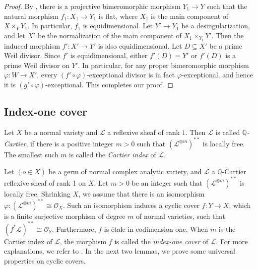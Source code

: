 \documentclass[12pt]{amsart}
\newcommand{\mbQ}{\mathbb{Q}}
\newcommand{\<}{\leq}
\def\subset{\subseteq}
\def\mcO{\mathcal{O}}
\def\mcL{\mathcal{L}}
\def\msL{\mathscr{L}}
\theoremstyle{remark}
\theoremstyle{definition}
\newtheorem{definition}[theorem]{Definition}
\theoremstyle{definition}
\numberwithin{equation}{section}
\theoremstyle{definition}
\theoremstyle{definition}
\begin{document}
\begin{proof}
 By   \cite[Corollary 1]{Hir75}, there is a  projective bimeromorphic morphism $Y_1\to Y$ such that the natural morphism $f_1\colon X_1 \to Y_1$ is flat, where $X_1$ is the main component of $X\times_Y Y_1$. 
In particular, $f_1$ is equidimensional. 
Let $Y' \to Y_1$ be a desingularization, and let $X'$ be the normalization of the main component of $X_1\times_{Y_1} Y'$. 
Then the induced morphism $f'\colon X'\to Y'$ is also equidimensional. Let $D\subset X'$ be a prime Weil divisor. Since $f'$ is equidimensional, either $f'(D)=Y'$ or $f'(D)$ is a prime Weil divisor on $Y'$. In particular, for any proper bimeromorphic morphism $\varphi\colon W\to X'$, every $(f'\circ\varphi)$-exceptional divisor is in fact $\varphi$-exceptional, and hence it is  $(g'\circ\varphi)$-exceptional. This completes our proof.
\end{proof}




\subsection{Index-one cover} 

Let $X$ be a normal variety and $\msL$ a reflexive sheaf of rank $1$. Then $\msL$ is called \textit{$\mbQ$-Cartier}, if there is a positive integer $m>0$ such that $(\msL^{\otimes m})^{**}$ is locally free. 
The smallest such $m$ is   called the \textit{Cartier index} of $\msL$. 
 

 


Let $(o\in X)$ be a germ of normal complex analytic variety, and $\mcL$ a $\mbQ$-Cartier reflexive sheaf of rank 1 on $X$.  
Let $m>0$ be an integer such that $(\mcL^{\otimes m})^{**}$ is locally free. 
Shrinking $X$,    we  assume that there is an isomorphism $\varphi\colon (\mcL^{\otimes m})^{**} \cong \mcO_X$. 
Such an isomorphism induces a cyclic cover $f\colon Y \to X$,  
which is a  finite surjective morphism  of degree $m$ of normal varieties, 
such that $(f^*\mcL)^{**}\cong \mcO_Y$. 
Furthermore, $f$ is \'etale in codimension one.  
When $m$ is the Cartier index of $\mcL$, the  morphism $f$ is called the \emph{index-one cover} of $\mcL$. 
For more explanations, we refer to \cite[Definition 2.52]{KM98}.  
In the next two lemmas, we prove some universal properties on cyclic covers. 
\end{document}
